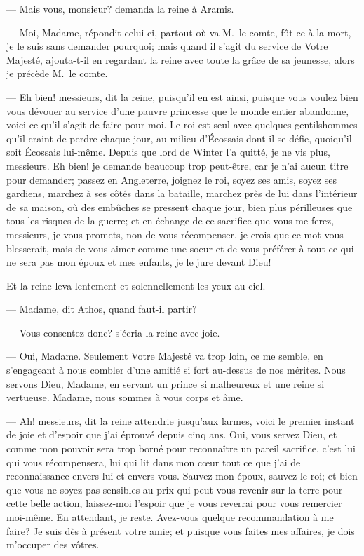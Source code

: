— Mais vous, monsieur? demanda la reine à Aramis.

— Moi, Madame, répondit celui-ci, partout où va M.~le comte, fût-ce à la mort, je le suis sans demander pourquoi; mais quand il s'agit du service de Votre Majesté, ajouta-t-il en regardant la reine avec toute la grâce de sa jeunesse, alors je précède M.~le comte.

— Eh bien! messieurs, dit la reine, puisqu'il en est ainsi, puisque vous voulez bien vous dévouer au service d'une pauvre princesse que le monde entier abandonne, voici ce qu'il s'agit de faire pour moi. Le roi est seul avec quelques gentilshommes qu'il craint de perdre chaque jour, au milieu d'Écossais dont il se défie, quoiqu'il soit Écossais lui-même. Depuis que lord de Winter l'a quitté, je ne vis plus, messieurs. Eh bien! je demande beaucoup trop peut-être, car je n'ai aucun titre pour demander; passez en Angleterre, joignez le roi, soyez ses amis, soyez ses gardiens, marchez à ses côtés dans la bataille, marchez près de lui dans l'intérieur de sa maison, où des embûches se pressent chaque jour, bien plus périlleuses que tous les risques de la guerre; et en échange de ce sacrifice que vous me ferez, messieurs, je vous promets, non de vous récompenser, je crois que ce mot vous blesserait, mais de vous aimer comme une soeur et de vous préférer à tout ce qui ne sera pas mon époux et mes enfants, je le jure devant Dieu!

Et la reine leva lentement et solennellement les yeux au ciel.

— Madame, dit Athos, quand faut-il partir?

— Vous consentez donc? s'écria la reine avec joie.

— Oui, Madame. Seulement Votre Majesté va trop loin, ce me semble, en s'engageant à nous combler d'une amitié si fort au-dessus de nos mérites. Nous servons Dieu, Madame, en servant un prince si malheureux et une reine si vertueuse. Madame, nous sommes à vous corps et âme.

— Ah! messieurs, dit la reine attendrie jusqu'aux larmes, voici le premier instant de joie et d'espoir que j'ai éprouvé depuis cinq ans. Oui, vous servez Dieu, et comme mon pouvoir sera trop borné pour reconnaître un pareil sacrifice, c'est lui qui vous récompensera, lui qui lit dans mon cœur tout ce que j'ai de reconnaissance envers lui et envers vous. Sauvez mon époux, sauvez le roi; et bien que vous ne soyez pas sensibles au prix qui peut vous revenir sur la terre pour cette belle action, laissez-moi l'espoir que je vous reverrai pour vous remercier moi-même. En attendant, je reste. Avez-vous quelque recommandation à me faire? Je suis dès à présent votre amie; et puisque vous faites mes affaires, je dois m'occuper des vôtres.

